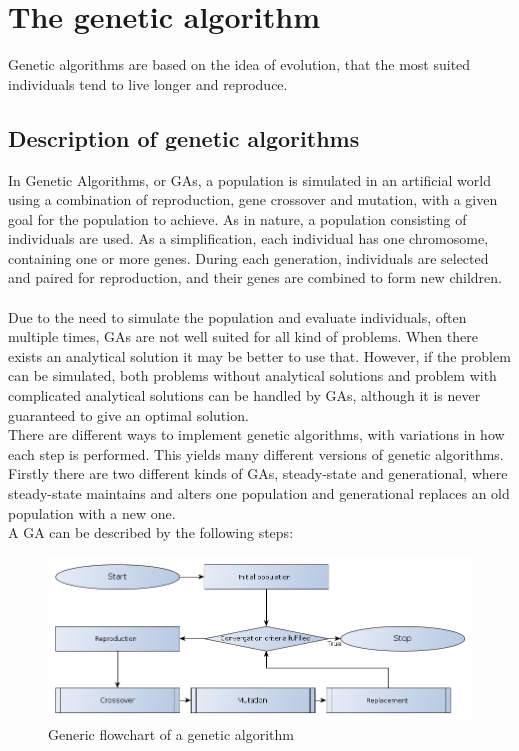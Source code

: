 \pagebreak
\section{The genetic algorithm}
Genetic algorithms are based on the idea of evolution, that the most suited individuals tend to live longer and reproduce. 
\subsection{Description of genetic algorithms}
In Genetic Algorithms, or GAs, a population is simulated in an artificial world using a combination of reproduction, gene crossover and mutation, with a given goal for the population to achieve. As in nature, a population consisting of individuals are used. As a simplification, each individual has one chromosome, containing one or more genes. During each generation, individuals are selected and paired for reproduction, and their genes are combined to form new children.\\
\\
Due to the need to simulate the population and evaluate individuals, often multiple times, GAs are not well suited for all kind of problems. When there exists an analytical solution it may be better to use that. However, if the problem can be simulated, both problems without analytical solutions and problem with complicated analytical solutions can be handled by GAs, although it is never guaranteed to give an optimal solution.\\
There are different ways to implement genetic algorithms, with variations in how each step is performed. This yields many different versions of genetic algorithms. Firstly there are two different kinds of GAs, steady-state and generational, where steady-state maintains and alters one population and generational replaces an old population with a new one.\\
A GA can be described by the following steps:
\begin{figure}[!h]
	\centering
	\includegraphics[width=\textwidth]{chapter_4_methods/GeneticFlowChart-Generic.jpg}
  	\caption[Generic flowchart of a genetic algorithm]
  	{Generic flowchart of a genetic algorithm}
\end{figure}
